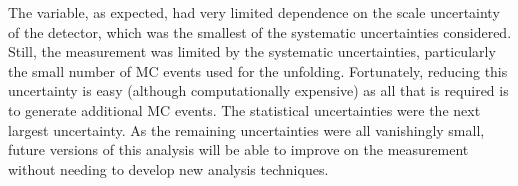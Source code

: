 The \phistar variable, as expected, had very limited dependence on the \pt
scale uncertainty of the detector, which was the smallest of the systematic
uncertainties considered. Still, the measurement was limited by the systematic
uncertainties, particularly the small number of MC events used for the
unfolding. Fortunately, reducing this uncertainty is easy (although
computationally expensive) as all that is required is to generate additional MC
events. The statistical uncertainties were the next largest uncertainty. As the
remaining uncertainties were all vanishingly small, future versions of this
analysis will be able to improve on the measurement without needing to develop
new analysis techniques.
